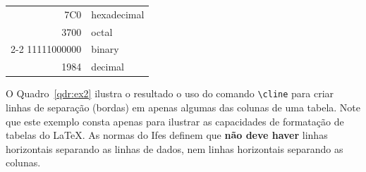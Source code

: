 \documentclass[times,english,brazilian,oneside,section=TITLE]{ifes8}
\begin{document}
\begin{quadro}[htb]
  \begin{center}
    \caption{Exemplo de uso de \texttt{cline} para formatação de quadros.}
    \label{qdr:ex2}
    \begin{tabular}{|r|l|}
      \hline
      7C0         & hexadecimal \\
      3700        & octal       \\ \cline{2-2}
      11111000000 & binary      \\
      \hline
      \hline
      1984        & decimal     \\
      \hline
    \end{tabular}
  \end{center}
\end{quadro}

O Quadro~\ref{qdr:ex2} ilustra o resultado o uso do comando
\verb!\cline! para criar linhas de separação (bordas) em apenas
algumas das colunas de uma tabela. Note que este exemplo consta apenas
para ilustrar as capacidades de formatação de tabelas do \LaTeX. As
normas do Ifes definem que \textbf{não deve haver} linhas horizontais
separando as linhas de dados, nem linhas horizontais separando as
colunas.
\end{document}
